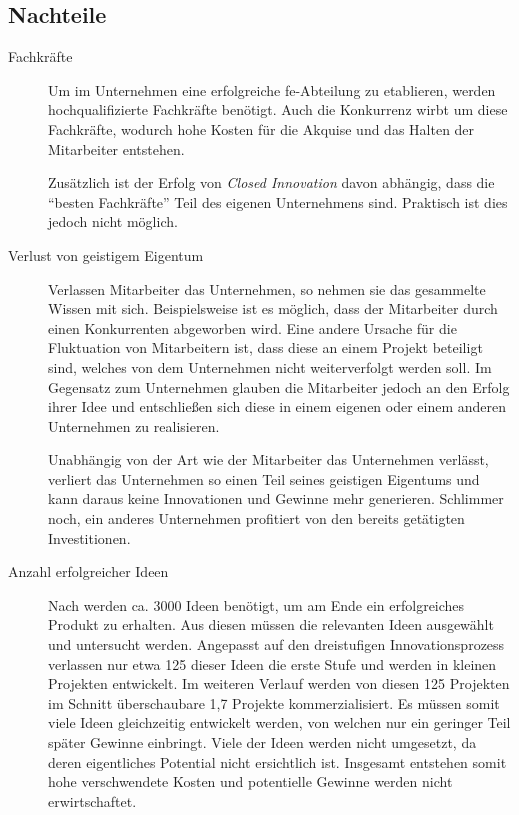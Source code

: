 \subsection{Nachteile}\label{sec:bewertung-nach}
\begin{description}
    \item[Fachkräfte]
        Um im Unternehmen eine erfolgreiche \ac{fe}-Abteilung zu etablieren,
        werden hochqualifizierte Fachkräfte benötigt.
        Auch die Konkurrenz \linebreak{}wirbt um diese Fachkräfte,
        wodurch hohe Kosten für die Akquise und das Halten der Mitarbeiter entstehen.

        Zusätzlich ist der Erfolg von \textit{Closed Innovation} davon abhängig,
        dass die \enquote{besten Fachkräfte} Teil des eigenen Unternehmens sind.
        Praktisch ist dies jedoch nicht möglich.

    \item[Verlust von geistigem Eigentum]
        Verlassen Mitarbeiter das Unternehmen, so nehmen sie das gesammelte Wissen mit sich.
        Beispielsweise ist es möglich, dass der Mitarbeiter durch einen Konkurrenten abgeworben wird.
        Eine andere Ursache für die Fluktuation von Mitarbeitern ist,
        dass diese an einem Projekt beteiligt sind,
        welches von dem Unternehmen nicht weiterverfolgt werden soll.
        Im Gegensatz zum Unternehmen glauben die Mitarbeiter jedoch an den Erfolg ihrer Idee
        und entschließen sich diese in einem eigenen oder einem anderen Unternehmen zu realisieren.

        Unabhängig von der Art wie der Mitarbeiter das Unternehmen verlässt,
        verliert das Unternehmen so einen Teil seines geistigen Eigentums
        und kann daraus keine Innovationen und Gewinne mehr generieren.
        Schlimmer noch, ein anderes Unternehmen profitiert von den bereits getätigten Investitionen.

    \item[Anzahl erfolgreicher Ideen]
        Nach \cite{stevens19973} werden ca. 3000 Ideen benötigt, um am Ende ein erfolgreiches Produkt zu erhalten.
        Aus diesen müssen die relevanten Ideen ausgewählt und untersucht werden.
        Angepasst auf den dreistufigen Innovationsprozess verlassen nur etwa 125 dieser Ideen die erste Stufe
        und werden in kleinen Projekten entwickelt.
        Im weiteren Verlauf werden von diesen 125 Projekten im Schnitt überschaubare 1,7 Projekte kommerzialisiert.
        Es müssen somit viele Ideen gleichzeitig entwickelt werden,
        von welchen nur ein geringer Teil später Gewinne einbringt.
        Viele der Ideen werden nicht umgesetzt, da deren eigentliches Potential nicht ersichtlich ist.
        Insgesamt entstehen somit hohe verschwendete Kosten und potentielle Gewinne werden nicht erwirtschaftet.


\end{description}
